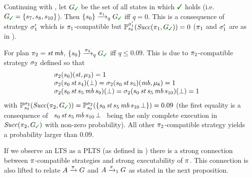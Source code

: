 \begin{example}\label{ex:running:plan-exec}
  Continuing with , let
  $G_{\goal}$
  be the set of all states in which $\goal$ holds (i.e. $G_{\goal} = \{s_7, s_8, s_{10}\}$).
  Then $\{s_0\}\reach{\plan_1}_qG_{\goal}$ iff $q=0$. This
  is a consequence of strategy $\sigma'_1$ which is
  $\pi_1$-compatible but
  $\Prob^{\strat'_1}_{s_0}(\Succ(\plan_1,G_{\goal}))=0$ ($\pi_1$ and
  $\sigma'_1$ are as in ).

  For plan $\pi_2 = \mathit{st}\,\mathit{mb}$,
  $\{s_0\}\reach{\plan_2}_qG_{\goal}$ iff $q\leq0.09$.  This is due to
  $\pi_2$-compatible strategy $\sigma_2$ defined so that
  \[
  \begin{array}{l}
    \sigma_2(s_0)(\mathit{st},\mu_3)=1\\
    \sigma_2(s_0\,\mathit{st}\,s_4)(\bot)=
    \sigma_2(s_0\,\mathit{st}\,s_5)(\mathit{mb},\mu_8)=1\\
    \sigma_2(s_0\,\mathit{st}\,s_5\,\mathit{mb}\,s_9)(\bot)=
    \sigma_2(s_0\,\mathit{st}\,s_5\,\mathit{mb}\,s_{10})(\bot)=1
  \end{array}
  \]
  with 
  $\Prob^{\strat_2}_{s_0}(\Succ(\plan_2,G_{\goal}))=\Prob^{\strat_2}_{s_0}(\{s_0\,\stairs\,s_5\,\mobile\,s_{10}\,\complete\})=0.09$
  (the first equality is a consequence of \
  $s_0\,\mathit{st}\,s_5\,\mathit{mb}\,s_{10}\,\bot$ \ being the only
  complete execution in $\Succ(\plan_2,G_{\goal})$ with non-zero
  probability).
  All other $\pi_2$-compatible strategy yields a probability larger
  than $0.09$.
  
\end{example}

If we observe an LTS as a PLTS (as defined in
) there is a strong connection between
$\pi$-compatible strategies and strong executability of $\pi$.
This connection is also lifted to relate $A \xrightarrow{\pi} G$ and $A
\xrightarrow{\pi}_1 G$ as stated in the next proposition.

